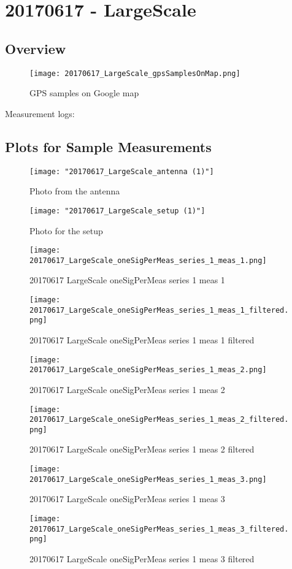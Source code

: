 \graphicspath{{../../../PostProcessingResults/SummaryReport/plots/}}
\section{20170617 - LargeScale}
\subsection{Overview}
\begin{figure}[ht] \caption{GPS samples on Google map}
\texttt{[image: 20170617\_LargeScale\_gpsSamplesOnMap.png]}\centering\end{figure}
\begin{minipage}{\textwidth} Measurement logs:

 \end{minipage}
\clearpage
\subsection{Plots for Sample Measurements}
\begin{figure}[ht] \caption{Photo from the antenna}
\texttt{[image: "20170617\_LargeScale\_antenna (1)"]}\centering\end{figure}
\begin{figure}[ht] \caption{Photo for the setup}
\texttt{[image: "20170617\_LargeScale\_setup (1)"]}\centering\end{figure}
\begin{figure}[ht] \caption{20170617 LargeScale oneSigPerMeas series 1 meas 1}
\texttt{[image: 20170617\_LargeScale\_oneSigPerMeas\_series\_1\_meas\_1.png]}\centering\end{figure}
\begin{figure}[ht] \caption{20170617 LargeScale oneSigPerMeas series 1 meas 1 filtered}
\texttt{[image: 20170617\_LargeScale\_oneSigPerMeas\_series\_1\_meas\_1\_filtered.png]}\centering\end{figure}
\begin{figure}[ht] \caption{20170617 LargeScale oneSigPerMeas series 1 meas 2}
\texttt{[image: 20170617\_LargeScale\_oneSigPerMeas\_series\_1\_meas\_2.png]}\centering\end{figure}
\begin{figure}[ht] \caption{20170617 LargeScale oneSigPerMeas series 1 meas 2 filtered}
\texttt{[image: 20170617\_LargeScale\_oneSigPerMeas\_series\_1\_meas\_2\_filtered.png]}\centering\end{figure}
\begin{figure}[ht] \caption{20170617 LargeScale oneSigPerMeas series 1 meas 3}
\texttt{[image: 20170617\_LargeScale\_oneSigPerMeas\_series\_1\_meas\_3.png]}\centering\end{figure}
\begin{figure}[ht] \caption{20170617 LargeScale oneSigPerMeas series 1 meas 3 filtered}
\texttt{[image: 20170617\_LargeScale\_oneSigPerMeas\_series\_1\_meas\_3\_filtered.png]}\centering\end{figure}
\clearpage
